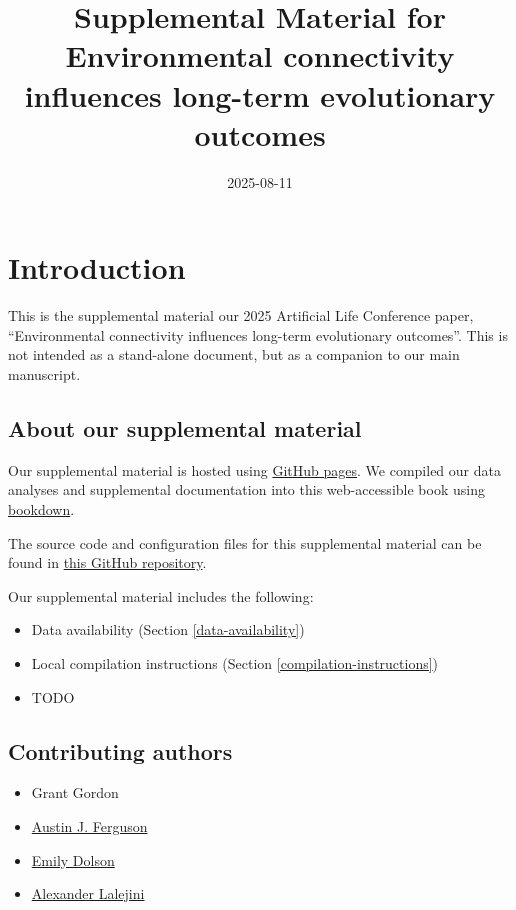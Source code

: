 \documentclass[
]{book}
\title{Supplemental Material for Environmental connectivity influences long-term evolutionary outcomes}
\author{}
\date{\vspace{-2.5em}2025-08-11}
\providecommand{\tightlist}{%
  \setlength{\itemsep}{0pt}\setlength{\parskip}{0pt}}
\begin{document}
\maketitle

{
\setcounter{tocdepth}{1}
\tableofcontents
}
\hypertarget{introduction}{%
\chapter{Introduction}\label{introduction}}

This is the supplemental material our 2025 Artificial Life Conference paper, ``Environmental connectivity influences long-term evolutionary outcomes''.
This is not intended as a stand-alone document, but as a companion to our main manuscript.

\hypertarget{about-our-supplemental-material}{%
\section{About our supplemental material}\label{about-our-supplemental-material}}

Our supplemental material is hosted using \href{https://pages.github.com/}{GitHub pages}.
We compiled our data analyses and supplemental documentation into this web-accessible book using \href{https://bookdown.org}{bookdown}.

The source code and configuration files for this supplemental material can be found in \href{https://github.com/amlalejini/alife-2025-env-conn}{this GitHub repository}.

Our supplemental material includes the following:

\begin{itemize}
\tightlist
\item
  Data availability
  (Section \ref{data-availability})
\item
  Local compilation instructions
  (Section \ref{compilation-instructions})
\item
  TODO
\end{itemize}

\hypertarget{contributing-authors}{%
\section{Contributing authors}\label{contributing-authors}}

\begin{itemize}
\tightlist
\item
  Grant Gordon
\item
  \href{https://fergusonaj.github.io/}{Austin J. Ferguson}
\item
  \href{https://ecodelab.com/}{Emily Dolson}
\item
  \href{https://lalejini.com}{Alexander Lalejini}
\end{itemize}
\end{document}
